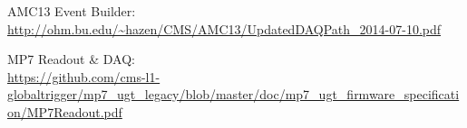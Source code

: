 \documentclass[11pt,a4paper,english,titlepage]{article}
\begin{document}
    \doctitlepage{}

    \doctoc{}

    

    \doctables{}

    \docfigures{}

    \clearpage

    \begin{thebibliography}{00}

    AMC13 Event Builder:\\
    \url{http://ohm.bu.edu/~hazen/CMS/AMC13/UpdatedDAQPath_2014-07-10.pdf}

    MP7 Readout \& DAQ:\\
    \url{https://github.com/cms-l1-globaltrigger/mp7_ugt_legacy/blob/master/doc/mp7_ugt_firmware_specification/MP7Readout.pdf}

    \end{thebibliography}

\end{document}
